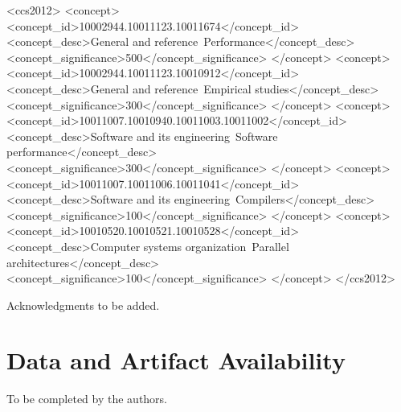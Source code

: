 \begin{CCSXML}
<ccs2012>
 <concept>
  <concept_id>10002944.10011123.10011674</concept_id>
  <concept_desc>General and reference~Performance</concept_desc>
  <concept_significance>500</concept_significance>
 </concept>
 <concept>
  <concept_id>10002944.10011123.10010912</concept_id>
  <concept_desc>General and reference~Empirical studies</concept_desc>
  <concept_significance>300</concept_significance>
 </concept>
 <concept>
  <concept_id>10011007.10010940.10011003.10011002</concept_id>
  <concept_desc>Software and its engineering~Software performance</concept_desc>
  <concept_significance>300</concept_significance>
 </concept>
 <concept>
  <concept_id>10011007.10011006.10011041</concept_id>
  <concept_desc>Software and its engineering~Compilers</concept_desc>
  <concept_significance>100</concept_significance>
 </concept>
 <concept>
  <concept_id>10010520.10010521.10010528</concept_id>
  <concept_desc>Computer systems organization~Parallel architectures</concept_desc>
  <concept_significance>100</concept_significance>
 </concept>
</ccs2012>
\end{CCSXML}



\maketitle









\begin{acks}
Acknowledgments to be added.
\end{acks}

\section*{Data and Artifact Availability}
To be completed by the authors.





